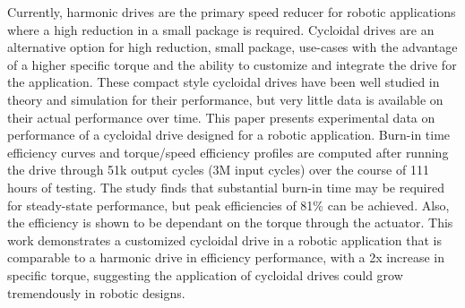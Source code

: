 Currently, harmonic drives are the primary speed reducer for robotic applications where a high reduction in a small package is required. 
Cycloidal drives are an alternative option for high reduction, small package, use-cases with the advantage of a higher specific torque and the ability to customize and integrate the drive for the application.
These compact style cycloidal drives have been well studied in theory and simulation for their performance, but very little data is available on their actual performance over time. 
This paper presents experimental data on performance of a cycloidal drive designed for a robotic application. 
Burn-in time efficiency curves and torque/speed efficiency profiles are computed after running the drive through 51k output cycles (3M input cycles) over the course of 111 hours of testing. 
The study finds that substantial burn-in time may be required for steady-state performance, but peak efficiencies of 81\% can be achieved. 
Also, the efficiency is shown to be dependant on the torque through the actuator.
This work demonstrates a customized cycloidal drive in a robotic application that is comparable to a harmonic drive in efficiency performance, with a 2x increase in specific torque, suggesting the application of cycloidal drives could grow tremendously in robotic designs. 